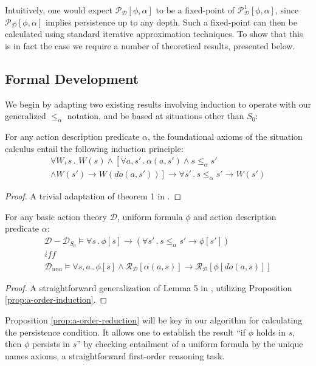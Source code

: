 Intuitively, one would expect $\mathcal{P}_{\mathcal{D}}[\phi,\alpha]$
to be a fixed-point of $\mathcal{P}_{\mathcal{D}}^{1}[\phi,\alpha]$,
since $\mathcal{P}_{\mathcal{D}}[\phi,\alpha]$ implies persistence
up to any depth. Such a fixed-point can then be calculated using standard
iterative approximation techniques. To show that this is in fact the
case we require a number of theoretical results, presented below.


\subsection{Formal Development}

We begin by adapting two existing results involving induction to operate
with our generalized $\leq_{\alpha}$ notation, and be based at situations
other than $S_{0}$:

\begin{prop}
For any action description predicate $\alpha$, the foundational axioms
of the situation calculus entail the following induction principle:\label{prop:a-order-induction}\begin{multline*}
\forall W,s\,.\,\, W(s)\wedge\left[\forall a,s'\,.\,\alpha(a,s')\wedge s\leq_{\alpha}s'\right.\\
\left.\wedge W(s')\rightarrow W(do(a,s'))\right]\rightarrow\forall s'\,.\, s\leq_{\alpha}s'\rightarrow W(s')\end{multline*}

\end{prop}
\begin{proof}
A trivial adaptation of theorem 1 in \citep{Reiter93proving}.
\end{proof}
\begin{prop}
For any basic action theory $\mathcal{D}$, uniform formula $\phi$
and action description predicate $\alpha$:\label{prop:a-order-reduction}\begin{gather*}
\mathcal{D}-\mathcal{D}_{S_{0}}\models\forall s\,.\,\phi[s]\rightarrow\left(\forall s'\,.\, s\leq_{\alpha}s'\rightarrow\phi[s']\right)\\
\mathit{iff}\\
\mathcal{D}_{una}\models\forall s,a\,.\,\phi[s]\wedge\mathcal{R}_{\mathcal{D}}[\alpha(a,s)]\rightarrow\mathcal{R}_{\mathcal{D}}[\phi[do(a,s)]]\end{gather*}

\end{prop}
\begin{proof}
A straightforward generalization of Lemma 5 in \citep{Lin94-StateConstraints},
utilizing Proposition \ref{prop:a-order-induction}.
\end{proof}
Proposition \ref{prop:a-order-reduction} will be key in our algorithm
for calculating the persistence condition. It allows one to establish
the result {}``if $\phi$ holds in $s$, then $\phi$ persists in
$s$'' by checking entailment of a uniform formula by the unique
names axioms, a straightforward first-order reasoning task.


